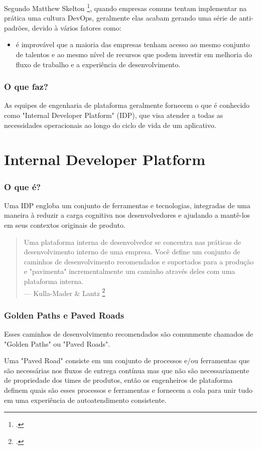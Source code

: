 \documentclass[
	11pt,
	aspectratio=169,
]{beamer}
\begin{document}
\begin{frame}

	Segundo Matthew Skelton \footcite{matthew}, quando empresas comuns tentam implementar
	na prática uma cultura DevOps, geralmente elas acabam gerando uma série de anti-padrões,
	devido à vários fatores como:
    \begin{itemize}
      \item é improvável que a maioria das empresas tenham acesso ao mesmo conjunto de talentos
      e ao mesmo nível de recursos que podem investir em melhoria do fluxo de trabalho
      e a experiência de desenvolvimento.
    \end{itemize}

\end{frame}

\begin{frame}
	\frametitle{O que faz?}

	As equipes de engenharia de plataforma geralmente fornecem o que é conhecido como
"Internal Developer Platform" (IDP), que visa atender a todas as necessidades
operacionais ao longo do ciclo de vida de um aplicativo.

\end{frame}

\section{Internal Developer Platform}

\begin{frame}
	\frametitle{O que é?}

	 Uma IDP engloba um conjunto de ferramentas e tecnologias, integradas de uma maneira à reduzir
	 a carga cognitiva nos desenvolvedores e ajudando a mantê-los em seus contextos originais de produto.
	\bigskip

	\begin{quote}
		Uma plataforma interna de desenvolvedor se concentra nas práticas de desenvolvimento interno de uma empresa.
	Você define um conjunto de caminhos de desenvolvimento recomendados e suportados para a produção e
	"pavimenta" incrementalmente um caminho através deles com uma plataforma interna.\\
		--- Kulla-Mader \& Lantz \footcite{kulla}
	\end{quote}

\end{frame}

\begin{frame}
	\frametitle{Golden Paths e Paved Roads}
  
  Esses caminhos de desenvolvimento recomendados são comunmente chamados de "Golden Paths" ou "Paved Roads".

  \bigskip

  Uma "Paved Road" consiste em um conjunto de processos e/ou ferramentas que são necessárias nos fluxos de
  entrega contínua mas que não são necessariamente de propriedade dos times de produtos, então os engenheiros
  de plataforma definem quais são esses processos e ferramentas e fornecem a cola para unir tudo em uma experiência
  de autoatendimento consistente.
\end{frame}
\end{document}
